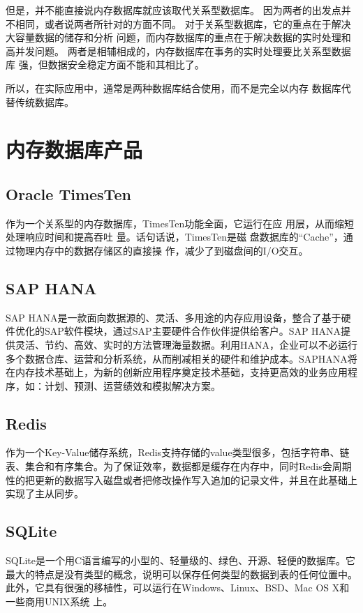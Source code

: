 \documentclass{zjutthesis}
\begin{document}
但是，并不能直接说内存数据库就应该取代关系型数据库。
因为两者的出发点并不相同，或者说两者所针对的方面不同。
对于关系型数据库，它的重点在于解决大容量数据的储存和分析
问题，而内存数据库的重点在于解决数据的实时处理和高并发问题。
两者是相辅相成的，内存数据库在事务的实时处理要比关系型数据库
强，但数据安全稳定方面不能和其相比了。

所以，在实际应用中，通常是两种数据库结合使用，而不是完全以内存
数据库代替传统数据库。

\section{内存数据库产品}
\subsection{Oracle TimesTen}
作为一个关系型的内存数据库，TimesTen功能全面，它运行在应
用层，从而缩短处理响应时间和提高吞吐
量。话句话说，TimesTen是磁
盘数据库的“Cache”，通过物理内存中的数据存储区的直接操
作，减少了到磁盘间的I/O交互。

\subsection{SAP HANA}
SAP HANA是一款面向数据源的、灵活、多用途的内存应用设备，整合了基于硬件优化的SAP软件模块，通过SAP主要硬件合作伙伴提供给客户。SAP HANA提供灵活、节约、高效、实时的方法管理海量数据。利用HANA，企业可以不必运行多个数据仓库、运营和分析系统，从而削减相关的硬件和维护成本。SAPHANA将在内存技术基础上，为新的创新应用程序奠定技术基础，支持更高效的业务应用程序，如：计划、预测、运营绩效和模拟解决方案。

\subsection{Redis}
作为一个Key-Value储存系统，Redis支持存储的value类型很多，包括字符串、链表、集合和有序集合。为了保证效率，数据都是缓存在内存中，同时Redis会周期性的把更新的数据写入磁盘或者把修改操作写入追加的记录文件，并且在此基础上实现了主从同步。

\subsection{SQLite}
SQLite是一个用C语言编写的小型的、轻量级的、绿色、开源、轻便的数据库。它最大的特点是没有类型的概念，说明可以保存任何类型的数据到表的任何位置中。此外，它具有很强的移植性，可以运行在Windows、Linux、BSD、Mac OS X和一些商用UNIX系统
上。
\end{document}
